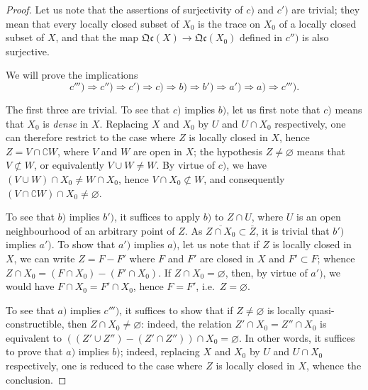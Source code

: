 \begin{proof}
Let us note that the assertions of surjectivity of $c)$ and $c')$ are trivial; they mean that every locally closed subset of $X_0$ is the trace on $X_0$ of a locally closed subset of $X$, and that the map $\mathfrak{Qc}(X)\to\mathfrak{Qc}(X_0)$ defined in $c'')$ is also surjective.

We will prove the implications
\[
  c''')\Rightarrow c'')\Rightarrow c')\Rightarrow c)\Rightarrow b)\Rightarrow b')\Rightarrow a')\Rightarrow a)\Rightarrow c''').
\]

The first three are trivial.
To see that $c)$ implies $b)$, let us first note that $c)$ means that $X_0$ is \emph{dense} in $X$.
Replacing $X$ and $X_0$ by $U$ and $U\cap X_0$ respectively, one can therefore restrict to the case where $Z$ is locally closed in $X$, hence $Z=V\cap\complement W$, where $V$ and $W$ are open in $X$; the hypothesis $Z\neq\varnothing$ means that $V\not\subset W$, or equivalently $V\cup W\neq W$.
By virtue of $c)$, we have $(V\cup W)\cap X_0\neq W\cap X_0$, hence $V\cap X_0\not\subset W$, and consequently $(V\cap\complement W)\cap X_0\neq\varnothing$.

To see that $b)$ implies $b')$, it suffices to apply $b)$ to $Z\cap U$, where $U$ is an open neighbourhood of an arbitrary point of $Z$.
As $\overline{Z\cap X_0}\subset\overline{Z}$, it is trivial that $b')$ implies $a')$.
To show that $a')$ implies $a)$, let us note that if $Z$ is locally closed in $X$, we can write $Z=F-F'$ where $F$ and $F'$ are closed in $X$ and $F'\subset F$; whence $Z\cap X_0=(F\cap X_0)-(F'\cap X_0)$.
If $Z\cap X_0=\varnothing$, then, by virtue of $a')$, we would have $F\cap X_0=F'\cap X_0$, hence $F=F'$, i.e.\ $Z=\varnothing$.

To see that $a)$ implies $c''')$, it suffices to show that if $Z\neq\varnothing$ is locally quasi-constructible, then $Z\cap X_0\neq\varnothing$: indeed, the relation $Z'\cap X_0=Z''\cap X_0$ is equivalent to $((Z'\cup Z'')-(Z'\cap Z''))\cap X_0=\varnothing$.
In other words, it suffices to prove that $a)$ implies $b)$; indeed, replacing $X$ and $X_0$ by $U$ and $U\cap X_0$ respectively, one is reduced to the case where $Z$ is locally closed in $X$, whence the conclusion.


\end{proof}
